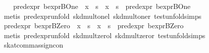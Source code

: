 \begin{isabellebody}
\isanewline
\ \ \isamarkupfalse%
\ {}pred{}expr\ bexpr{}BOne\ {}\ x\ {}{}\ s\ {}\ x\ {}{}\ s\ {}\ pred{}expr\ bexpr{}BOne{}\isanewline
\ \ \ \ \isamarkupfalse%
\ {}metis\ pred{}expr{}unfold\ skd{}mult{}onel\ skd{}mult{}oner\ test{}unfold{}simps{}{}{}{}\isanewline
{}\isamarkupfalse%
\isanewline
\ \ \isamarkupfalse%
\ {}pred{}expr\ bexpr{}BZero\ {}\ x\ {}{}\ s\ {}\ x\ {}{}\ s\ {}\ pred{}expr\ bexpr{}BZero{}\isanewline
\ \ \ \ \isamarkupfalse%
\ {}metis\ pred{}expr{}unfold\ skd{}mult{}zerol\ skd{}mult{}zeror\ test{}unfold{}simps{}{}{}{}\isanewline
{}\isamarkupfalse%
%
\endisatagproof
{\isafoldproof}%
%
\isadelimproof
\isanewline
%
\endisadelimproof
\isanewline
{}\isamarkupfalse%
\ skat{}comm{}assign{}con{}\isanewline

\end{isabellebody}
